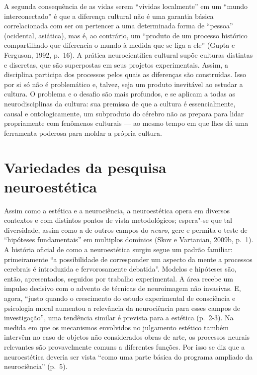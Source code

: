 A segunda consequência de as vidas serem ``vividas localmente'' em um
``mundo interconectado'' é que a diferença cultural não é uma garantia
básica correlacionada com ser ou pertencer a uma determinada forma de
``pessoa'' (ocidental, asiática), mas é, ao contrário, um ``produto de
um processo histórico compartilhado que diferencia o mundo à medida que
se liga a ele'' (Gupta e Ferguson, 1992, p.~16). A prática
neurocientífica cultural supõe culturas distintas e discretas, que são
superpostas em seus projetos experimentais. Assim, a disciplina
participa dos processos pelos quais as diferenças são construídas. Isso
por si só não é problemático e, talvez, seja um produto inevitável ao
estudar a cultura. O problema e o desafio são mais profundos, e se
aplicam a todas as neurodisciplinas da cultura: sua premissa de que a
cultura é essencialmente, causal e ontologicamente, um subproduto do
cérebro não as prepara para lidar propriamente com fenômenos culturais
--- ao mesmo tempo em que lhes dá uma ferramenta poderosa para moldar a
própria cultura.

\section{Variedades da pesquisa neuroestética}

Assim como a estética e a neurociência, a neuroestética opera em
diversos contextos e com distintos pontos de vista metodológicos;
espera"-se que tal diversidade, assim como a de outros campos do
\emph{neuro}, gere e permita o teste de ``hipóteses fundamentais'' em
multiplos domínios (Skov e Vartanian, 2009b, p.~1). A história oficial de
como a neuroestética surgiu segue um padrão familiar: primeiramente ``a
possibilidade de corresponder um aspecto da mente a processos cerebrais
é introduzida e fervorosamente debatida''. Modelos e hipóteses são,
então, apresentados, seguidos por trabalho experimental. A área recebe
um impulso decisivo com o advento de técnicas de neuroimagem não
invasivas. E, agora, ``justo quando o crescimento do estudo experimental
de consciência e psicologia moral aumentou a relevância da neurociência
para esses campos de investigação'', uma tendência similar é prevista
para a estética (p.~2-3). Na medida em que os mecanismos envolvidos no
julgamento estético também intervêm no caso de objetos não considerados
obras de arte, os processos neurais relevantes são provavelmente comuns
a diferentes funções. Por isso se diz que a neuroestética deveria ser
vista ``como uma parte básica do programa ampliado da neurociência''
(p.~5).

